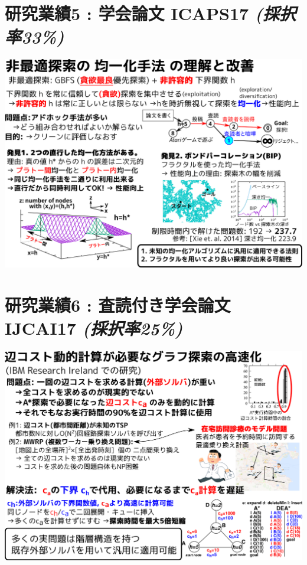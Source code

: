 \section{研究業績5 : 学会論文 ICAPS17 \textbf{\emph{(採択率33\%)}}}
\label{sec-7}

\begin{resume}
\end{resume}

\includegraphics{img/icaps17.png}

\section{研究業績6 : 査読付き学会論文 IJCAI17 \textbf{\emph{(採択率25\%)}}}
\label{sec-8}

\begin{resume}
\end{resume}

\includegraphics{img/ijcai17.png}

